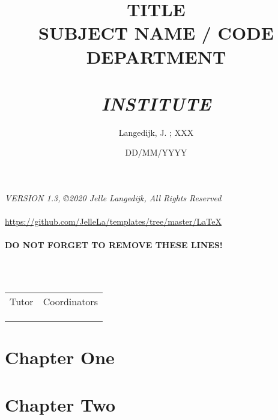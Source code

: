 \documentclass[a4paper,10pt]{article}
\title{           \textbf{TITLE} \\
                    \large{SUBJECT NAME / CODE} \\
                    \large{DEPARTMENT} \\
                    \hfill \\
                    \textit{INSTITUTE}
}
\author{Langedijk, J. ; XXX}
\date{DD/MM/YYYY}
\begin{document}
\begin{center}
\textit{VERSION 1.3, ©2020 Jelle Langedijk, All Rights Reserved } \\
\hfill \\
\url{https://github.com/JelleLa/templates/tree/master/LaTeX}\\
\hfill \\
\textbf{DO NOT FORGET TO REMOVE THESE LINES!}\\
\end{center}

\newpage


\maketitle

\hfill \\
\hfill \\

\begin{table}[H]
\centering
\begin{tabular}{ll}
    Tutor   & Coordinators \\
                &              \\
                &              \\
                &             
\end{tabular}
\end{table}



\newpage
\section{Chapter One}

\newpage
\section{Chapter Two}
\end{document}
